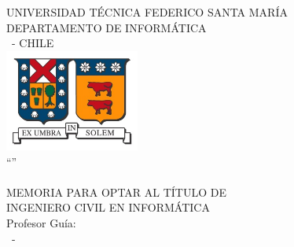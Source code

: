 \begin{titlepage}
\begin{center}
\noindent
{\fontsize{18}{22}\selectfont UNIVERSIDAD TÉCNICA FEDERICO SANTA MARÍA \\}
{\fontsize{16}{19}\selectfont DEPARTAMENTO DE INFORMÁTICA \\}
{\fontsize{16}{19}\selectfont \MakeUppercase{\ciudad}\ - CHILE \\}
\vspace{1.5cm}
\includegraphics[width=4.41cm,height=3.34cm]{logo/logo.jpg} \\
\vspace{1.5cm}
{\fontsize{20}{24}\selectfont ``\MakeUppercase{\titulo}'' \\}
\vfill
{\fontsize{16}{19}\selectfont \MakeUppercase{\nombrealumno} \\}
\vfill
{\fontsize{16}{19}\selectfont MEMORIA PARA OPTAR AL TÍTULO DE \\}
{\fontsize{16}{19}\selectfont INGENIERO CIVIL EN INFORMÁTICA \\}
\vspace{1.5cm}
{\fontsize{14}{17}\selectfont Profesor Guía: \nombreprofesor \\}
\vspace{2.5cm}
{\fontsize{14}{17}\selectfont \mesexamen\ - \anioexamen \\}
\end{center}
\end{titlepage}


